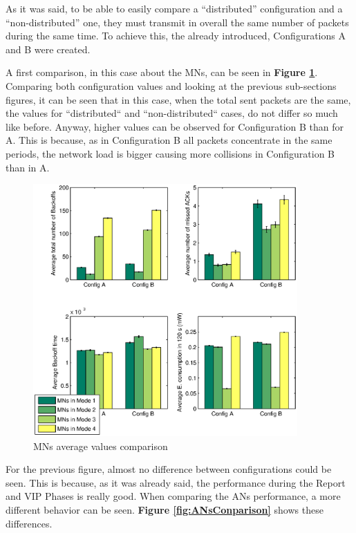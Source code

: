 As it was said, to be able to easily compare a ``distributed'' configuration and a ``non-distributed'' one, they must transmit in overall the same
number of packets during the same time. To achieve this, the already introduced, Configurations A and B were created.

A first comparison, in this case about the \acp{MN}, can be seen in \textbf{Figure \ref{fig:MNsAverageValuesin120s}}. Comparing both
configuration values and looking at the previous sub-sections figures, it can be seen that in this case, when the total sent packets are the 
same, the values for ``distributed`` and ``non-distributed`` cases, do not differ so much like before. Anyway, higher values can be observed 
for Configuration B than for A. This is because, as in Configuration B all packets concentrate in the same periods, the network load is 
bigger causing more collisions in Configuration B than in A.

\begin{figure}[ht]
 \begin{center}
  \includegraphics[width=0.9\textwidth]{MNsAverageValuesin120s.eps}
 \end{center}
 \caption{\acp{MN} average values comparison}
 \label{fig:MNsAverageValuesin120s}
\end{figure}

For the previous figure, almost no difference between configurations could be seen. This is because, as it was already said, the performance
during the Report and \ac{VIP} Phases is really good. When comparing the \acp{AN} performance, a more different behavior can be seen. 
\textbf{Figure \ref{fig:ANsConparison}} shows these differences. 

